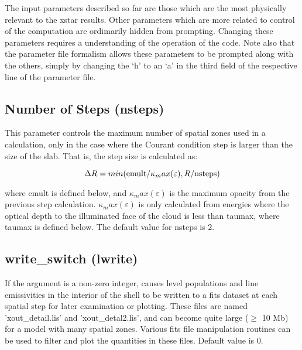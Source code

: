 The input parameters described so far are those which are the most physically 
relevant to the xstar results.  Other parameters which are more related 
to control of the computation are ordimarily hidden from prompting.
Changing  these parameters requires a understanding of the 
operation of the code.  Note also that the parameter file formalism
allows these parameters to be prompted along with the others, 
simply by changing the `h' to an `a' in the third field of the respective
line of the parameter file.

\subsection{Number of Steps (nsteps)}

This parameter controls the maximum number of spatial zones 
used in a calculation, only in the case where the Courant condition
step is larger than the size of the slab.  That is, 
the step size is calculated as:

$$\Delta R = min( {\rm emult}/\kappa_max(\varepsilon), R/{\rm nsteps})$$

where emult is defined below, and $\kappa_max(\varepsilon)$ is the maximum opacity from the 
previous step calculation.  $\kappa_max(\varepsilon)$  is only calculated from energies where
the optical depth to the illuminated face of the cloud is less than taumax, where 
taumax is defined below.  The default value for nsteps is 2.

\subsection{write\_switch (lwrite)} If the argument is 
a non-zero integer, causes level populations and line emissivities in the interior of the 
shell to be written to a fits dataset at each spatial step for later examination 
or plotting.  These files are named 'xout\_detail.lis' and 'xout\_detal2.lis', 
and can become quite large 
($\geq$ 10 Mb) for a model with many spatial zones.  Various fits
file manipulation routines can be used to filter and plot the
quantities in these files.  Default value is 0.

